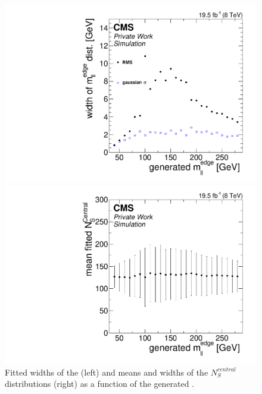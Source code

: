 \begin{figure}[!hbp]
  \centering
  \begin{minipage}[t]{0.49\textwidth}
    \includegraphics[width=\textwidth]{plots/results/fit/toyResults/WidthsvsGenM0Ratio_signalInjectedN125.pdf}
  \end{minipage}
  \begin{minipage}[t]{0.49\textwidth}
    \includegraphics[width=\textwidth]{plots/results/fit/toyResults/meanNSvsGenM0_signalInjectedN125.pdf}
  \end{minipage}
  \caption{Fitted widths of the \mlledge (left) and means and widths of the $N_S^{central}$ distributions (right) as a function of the generated \mlledge.}
    \label{fig:toys:scanFits}
\end{figure}

